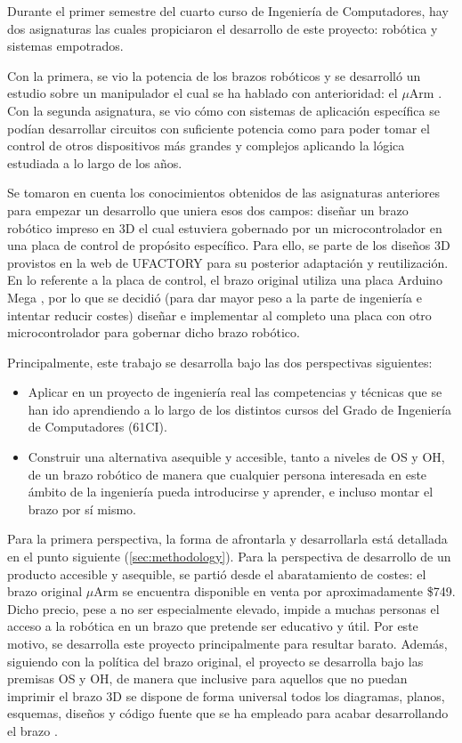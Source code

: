 Durante el primer semestre del cuarto curso de Ingeniería de Computadores,
hay dos asignaturas las cuales propiciaron el desarrollo de este proyecto: robótica
y sistemas empotrados.

Con la primera, se vio la potencia de los brazos robóticos y se desarrolló un estudio
sobre un manipulador el cual se ha hablado con anterioridad: el $\mu$Arm \cite{UPMRoboticsUarm2019b}.
Con la segunda asignatura, se vio cómo con sistemas de aplicación específica se podían
desarrollar circuitos con suficiente potencia como para poder tomar el control de otros
dispositivos más grandes y complejos aplicando la lógica estudiada a lo largo de los
años.

Se tomaron en cuenta los conocimientos obtenidos de las asignaturas anteriores
para empezar un desarrollo que uniera esos dos campos: diseñar un brazo robótico
impreso en 3D el cual estuviera gobernado por un microcontrolador en una placa de
control de propósito específico. Para ello, se parte de los diseños 3D provistos
en la web de UFACTORY \cite{UFACTORYXArmTextbackslashtextbaruArm} para su posterior
adaptación y reutilización. En lo referente a la placa de control, el brazo original
utiliza una placa Arduino Mega \cite{ArduinoMega2560}, por lo que se decidió (para dar
mayor peso a la parte de ingeniería e intentar reducir costes) diseñar e implementar al completo una placa con
otro microcontrolador para gobernar dicho brazo robótico.

Principalmente, este trabajo se desarrolla bajo las dos perspectivas siguientes:
\begin{itemize}
    \item Aplicar en un proyecto de ingeniería real las competencias y técnicas que 
    se han ido aprendiendo a lo largo de los distintos cursos del Grado de Ingeniería
    de Computadores (61CI).
    \item Construir una alternativa asequible y accesible, tanto a niveles de \ac{OS} y
    \ac{OH}, de un brazo robótico de manera que cualquier persona interesada en este
    ámbito de la ingeniería pueda introducirse y aprender, e incluso montar el brazo
    por sí mismo.
\end{itemize}

Para la primera perspectiva, la forma de afrontarla y desarrollarla está detallada en el
punto siguiente (\ref{sec:methodology}). Para la perspectiva de desarrollo de un
producto accesible y asequible, se partió desde el abaratamiento de costes: el brazo
original $\mu$Arm se encuentra disponible en venta por aproximadamente \$749. Dicho precio,
pese a no ser especialmente elevado, impide a muchas personas el acceso a la robótica
en un brazo que pretende ser educativo y útil. Por este motivo, se desarrolla este proyecto
principalmente para resultar barato. Además, siguiendo con la política del brazo
original, el proyecto se desarrolla bajo las premisas \ac{OS} y \ac{OH}, de manera que
inclusive para aquellos que no puedan imprimir el brazo 3D se dispone de forma universal
todos los diagramas, planos, esquemas, diseños y código fuente que se ha empleado para
acabar desarrollando el brazo \pArm{}.